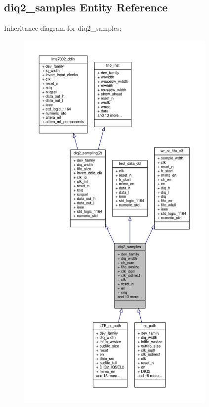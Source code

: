 \subsection{diq2\+\_\+samples Entity Reference}
\label{classdiq2__samples}


Inheritance diagram for diq2\+\_\+samples\+:\nopagebreak
\begin{figure}[H]
\begin{center}
\leavevmode
\includegraphics[height=550pt]{dc/dd5/classdiq2__samples__inherit__graph}
\end{center}
\end{figure}


